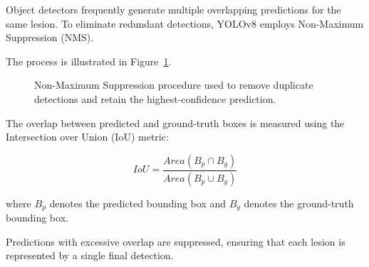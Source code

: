 Object detectors frequently generate multiple overlapping predictions for the same lesion. To eliminate redundant detections, YOLOv8 employs Non-Maximum Suppression (NMS).

The process is illustrated in Figure~\ref{fig:yolo_nms}.

\begin{figure}[H]
	\centering
	
	
	\caption{Non-Maximum Suppression procedure used to remove duplicate detections and retain the highest-confidence prediction.}
	\label{fig:yolo_nms}
\end{figure}

The overlap between predicted and ground-truth boxes is measured using the Intersection over Union (IoU) metric:

\[
IoU =
\frac
{
	Area(B_p \cap B_g)
}
{
	Area(B_p \cup B_g)
}
\]

where \(B_p\) denotes the predicted bounding box and \(B_g\) denotes the ground-truth bounding box.

Predictions with excessive overlap are suppressed, ensuring that each lesion is represented by a single final detection.

